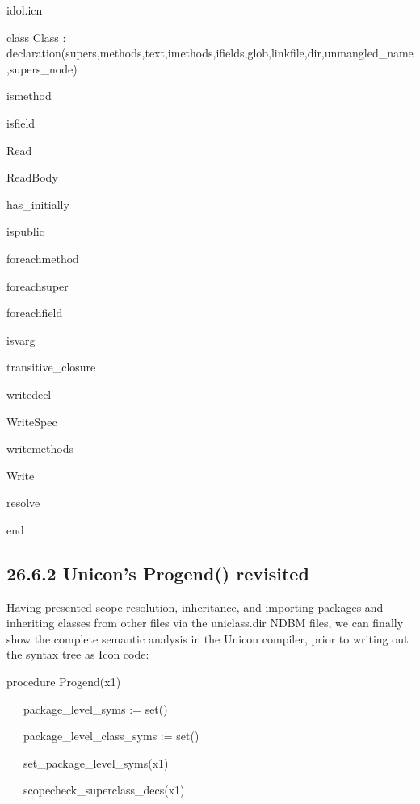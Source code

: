 {\ttfamily\mdseries
idol.icn}

{\ttfamily\mdseries
class Class : declaration(supers,methods,text,imethods,ifields,glob,linkfile,dir,unmangled\_name,supers\_node)}

{\ttfamily\mdseries
ismethod}

{\ttfamily\mdseries
isfield}

{\ttfamily\mdseries
Read}

{\ttfamily\mdseries
ReadBody}

{\ttfamily\mdseries
has\_initially}

{\ttfamily\mdseries
ispublic}

{\ttfamily\mdseries
foreachmethod}

{\ttfamily\mdseries
foreachsuper}

{\ttfamily\mdseries
foreachfield}

{\ttfamily\mdseries
isvarg}

{\ttfamily\mdseries
transitive\_closure}

{\ttfamily\mdseries
writedecl}

{\ttfamily\mdseries
WriteSpec}

{\ttfamily\mdseries
writemethods}

{\ttfamily\mdseries
Write}

{\ttfamily\mdseries
resolve}

{\ttfamily\mdseries
end}

\subsection[26.6.2 Unicon's Progend() revisited]{26.6.2 Unicon's Progend() revisited}

Having presented scope resolution, inheritance, and importing packages
and inheriting classes from other files via the uniclass.dir NDBM
files, we can finally show the complete semantic analysis in the
Unicon compiler, prior to writing out the syntax tree as Icon code:

{\ttfamily\mdseries
procedure Progend(x1)}


\bigskip

{\ttfamily\mdseries
\ \ \ package\_level\_syms := set()}

{\ttfamily\mdseries
\ \ \ package\_level\_class\_syms := set()}

{\ttfamily\mdseries
\ \ \ set\_package\_level\_syms(x1)}

{\ttfamily\mdseries
\ \ \ scopecheck\_superclass\_decs(x1)}


